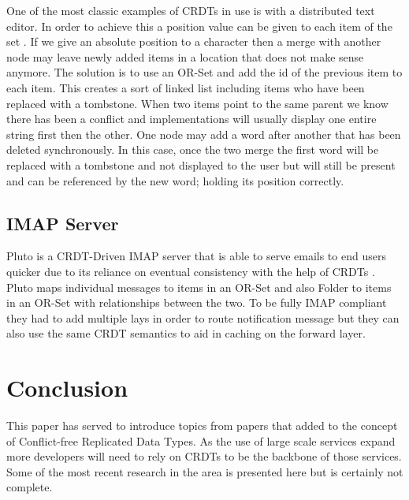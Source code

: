 \documentclass{article}
\begin{document}
\begin{multicols}{2}
\begin{refsection}
One of the most classic examples of CRDTs in use is with a distributed text editor. In order to achieve this a position value can be given to each item of the set \cite{kleppmann_conflict-free_2017}. If we give an absolute position to a character then a merge with another node may leave newly added items in a location that does not make sense anymore. The solution is to use an OR-Set and add the id of the previous item to each item. This creates a sort of linked list including items who have been replaced with a tombstone. When two items point to the same parent we know there has been a conflict and implementations will usually display one entire string first then the other. One node may add a word after another that has been deleted synchronously. In this case, once the two merge the first word will be replaced with a tombstone and not displayed to the user but will still be present and can be referenced by the new word; holding its position correctly.

\subsection*{IMAP Server}

Pluto is a CRDT-Driven IMAP server that is able to serve emails to end users quicker due to its reliance on eventual consistency with the help of CRDTs \cite{jungnickel_pluto:_2017}. Pluto maps individual messages to items in an OR-Set and also Folder to items in an OR-Set with relationships between the two. To be fully IMAP compliant they had to add multiple lays in order to route notification message but they can also use the same CRDT semantics to aid in caching on the forward layer.

\section*{Conclusion}

This paper has served to introduce topics from papers that added to the concept of Conflict-free Replicated Data Types. As the use of large scale services expand more developers will need to rely on CRDTs to be the backbone of those services. Some of the most recent research in the area is presented here but is certainly not complete.

\printbibliography[title=References]
\end{refsection}

\end{multicols}
\end{document}
